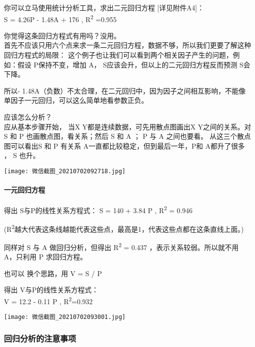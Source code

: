 你可以立马使用统计分析工具，求出二元回归方程 {[}详见附件A4{]}：\\
S = 4.26P - 1.48A + 176 , R\textsuperscript{2} =0.955

你觉得这条回归方程式有用吗？没用。\\
首先不应该只用六个点来求一条二元回归方程，数据不够，所以我们更要了解这种回归方程式的局限：
这个例子也让我们可以看到两个相关因子产生的问题，例如：假设
P保持不变，增加 A， S应该会升，但以上的二元回归方程反而预测 S会下降。

所以-
1.48A（负数）不太合理，在二元回归中，因为因子之间相互影响，不能像单因子一元回归，可以这么简单地看参数正负。

应该怎么分析？\\
应从基本步骤开始， 当X Y都是连续数据，可先用散点图画出X Y之间的关系。对
S 和 P 也画散点图，看关系；然后 S 和 A ； P 与 A 之间也要看。
从这三个散点图可以看出S 和 P 有关系 A一直都比较稳定，但到最后一年，P和
A都升了很多 ， S 也升。


\texttt{[image: 微信截图\_20210702092718.jpg]}\\

\hypertarget{ux4e00ux5143ux56deux5f52ux65b9ux7a0b}{%
\paragraph{一元回归方程}\label{ux4e00ux5143ux56deux5f52ux65b9ux7a0b}}

得出 S与P的线性关系方程式： S = 140 + 3.84 P , R\textsuperscript{2} =
0.946

(R\textsuperscript{2}越大代表这条线越能代表这些点，最高是1，代表这些点都在这条直线上面。)

同样对 S 与 A 做回归分析，但得出 R\textsuperscript{2} = 0.437
，表示关系较弱。所以就不用 A，只利用 P 求回归方程。

也可以 换个思路，用 V = S / P

得出 V与P的线性关系方程式：\\
V = 12.2 - 0.11 P , R\textsuperscript{2}=0.932


\texttt{[image: 微信截图\_20210702093001.jpg]}\\

\hypertarget{ux56deux5f52ux5206ux6790ux7684ux6ce8ux610fux4e8bux9879}{%
\subsubsection{回归分析的注意事项}\label{ux56deux5f52ux5206ux6790ux7684ux6ce8ux610fux4e8bux9879}}

